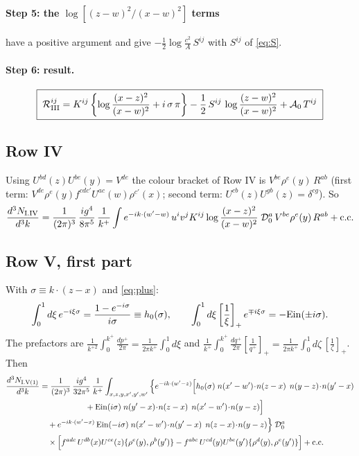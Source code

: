 \documentclass[10pt]{article}
\numberwithin{equation}{section}
\begin{document}
\paragraph{Step 5: the $\log[(z-w)^{2}/(x-w)^{2}]$ terms} have a positive argument and give $-\tfrac12\log\frac{c^{2}}{A}\,S^{ij}$ with $S^{ij}$ of \eqref{eq:S}.

\paragraph{Step 6: result.}
\begin{align}
\boxed{\;\mathcal{R}_{\rm III}^{ij}=K^{ij}\left\{\log\frac{(x-z)^{2}}{(x-w)^{2}}+i\,\sigma\,\pi\right\}
-\frac12\,S^{ij}\,\log\frac{(z-w)^{2}}{(x-w)^{2}}+\mathcal{A}_{0}\,T^{ij}\;} \label{eq:RowIIIfinal}
\end{align}

\subsection{Row IV}
Using $U^{bd}(z)U^{be}(y)=V^{de}$ the colour bracket of Row IV is $V^{be}\rho^{e}(y)\,R^{ab}$ (first term: $V^{de}\rho^{e}(y)f^{cdc'}U^{ac}(w)\rho^{c'}(x)$; second term: $U^{cb}(z)U^{gb}(z)=\delta^{cg}$). So
\begin{align}
\frac{d^{3}N_{\rm I.IV}}{d^{3}k}=\frac{1}{(2\pi)^{3}}\,\frac{ig^{4}}{8\pi^{5}}\,\frac{1}{k^{+}}\int e^{-ik\cdot(w'-w)}\,u^{i}v^{j}K^{ij}\log\frac{(x-z)^{2}}{(x-w)^{2}}\;\mathcal{D}_{0}^{a}\,V^{be}\rho^{e}(y)\,R^{ab}+{\rm c.c.}
\end{align}

\subsection{Row V, first part}
With $\sigma\equiv k\cdot(z-x)$ and \eqref{eq:plus}:
\begin{align}
\int_{0}^{1}d\xi\,e^{-i\xi\sigma}=\frac{1-e^{-i\sigma}}{i\sigma}\equiv h_{0}(\sigma),\qquad
\int_{0}^{1}d\xi\left[\frac1\xi\right]_{+}e^{\mp i\xi\sigma}=-{\rm Ein}(\pm i\sigma).
\end{align}
The prefactors are $\frac{1}{k^{+2}}\int_{0}^{k^{+}}\frac{dp^{+}}{2\pi}=\frac{1}{2\pi k^{+}}\int_{0}^{1}d\xi$ and $\frac{1}{k^{+}}\int_{0}^{k^{+}}\frac{dq^{+}}{2\pi}[\frac{1}{q^{+}}]_{+}=\frac{1}{2\pi k^{+}}\int_{0}^{1}d\zeta\,[\frac1\zeta]_{+}$. Then
\begin{align}
\frac{d^{3}N_{\rm I.V(1)}}{d^{3}k}&=\frac{1}{(2\pi)^{3}}\,\frac{ig^{4}}{32\pi^{5}}\,\frac{1}{k^{+}}\int_{x,z,y,x',y',w'}\Big\{e^{-ik\cdot(w'-z)}\Big[h_{0}(\sigma)\;n(x'-w')\!\cdot\!n(z-x)\;\,n(y-z)\!\cdot\!n(y'-x)\notag\\
&\hspace{2cm}+{\rm Ein}(i\sigma)\;n(y'-x)\!\cdot\!n(z-x)\;\,n(x'-w')\!\cdot\!n(y-z)\Big]\notag\\
&\quad+e^{-ik\cdot(w'-x)}\,{\rm Ein}(-i\sigma)\;n(x'-w')\!\cdot\!n(y'-x)\;\,n(z-x)\!\cdot\!n(y-z)\Big\}\;\mathcal{D}_{0}^{a}\notag\\
&\quad\times\Big[f^{adc}\,U^{db}(x)U^{ce}(z)\{\rho^{e}(y),\rho^{b}(y')\}-f^{abc}\,U^{cd}(y)U^{be}(y')\{\rho^{d}(y),\rho^{e}(y')\}\Big]+{\rm c.c.} \label{eq:RowV1}
\end{align}
\end{document}
